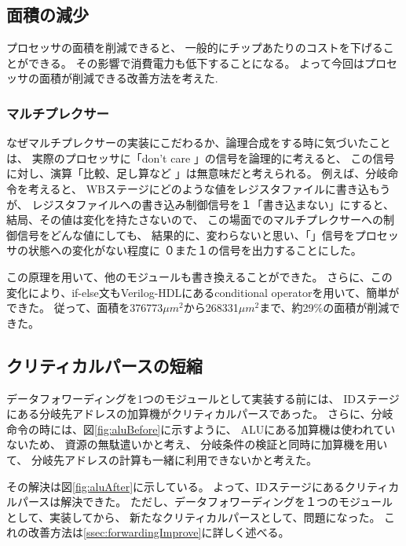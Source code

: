\documentclass[../main.tex]{subfiles}
\begin{document}
    \subsection{面積の減少}
        プロセッサの面積を削減できると、
        一般的にチップあたりのコストを下げることができる。
        その影響で消費電力も低下することになる。
        よって今回はプロセッサの面積が削減できる改善方法を考えた.

        \subsubsection{マルチプレクサー}
        なぜマルチプレクサーの実装にこだわるか、論理合成をする時に気づいたことは、
        実際のプロセッサに「don't care 」の信号を論理的に考えると、
        この信号に対し、演算「比較、足し算など 」は無意味だと考えられる。
        例えば、分岐命令を考えると、
        WBステージにどのような値をレジスタファイルに書き込もうが、
        レジスタファイルへの書き込み制御信号を１「書き込まない」にすると、
        結局、その値は変化を持たさないので、
        この場面でのマルチプレクサーへの制御信号をどんな値にしても、
        結果的に、変わらないと思い、「」信号をプロセッサの状態への変化がない程度に
        ０また１の信号を出力することにした。

        この原理を用いて、他のモジュールも書き換えることができた。
        さらに、この変化により、if-else文もVerilog-HDLにあるconditional operatorを用いて、簡単ができた。
        従って、面積を376773$\mu$$m^2$から268331$\mu$$m^2$まで、約29$\%$の面積が削減できた。

    \subsection{クリティカルパースの短縮} \label{ssec:aluImprove}
        データフォワーディングを1つのモジュールとして実装する前には、
        IDステージにある分岐先アドレスの加算機がクリティカルパースであった。
        さらに、分岐命令の時には、図\ref{fig:aluBefore}に示すように、
        ALUにある加算機は使われていないため、
        資源の無駄遣いかと考え、
        分岐条件の検証と同時に加算機を用いて、
        分岐先アドレスの計算も一緒に利用できないかと考えた。

        その解決は図\ref{fig:aluAfter}に示している。
        よって、IDステージにあるクリティカルパースは解決できた。
        ただし、データフォワーディングを１つのモジュールとして、実装してから、
        新たなクリティカルパースとして、問題になった。
        これの改善方法は\ref{ssec:forwardingImprove}に詳しく述べる。
\end{document}
